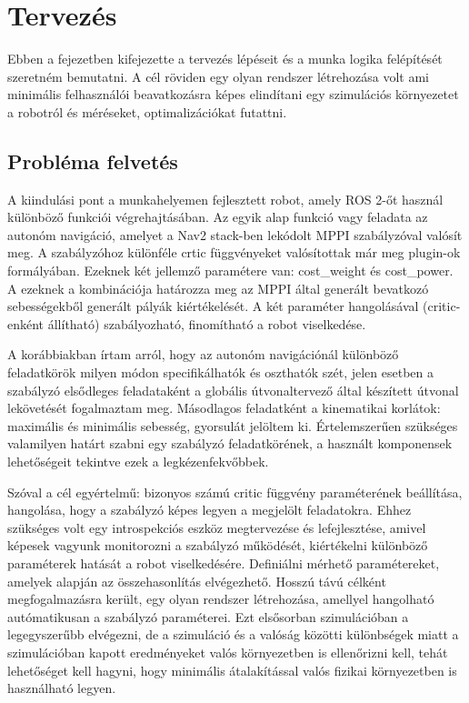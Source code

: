 \chapter{Tervezés}
Ebben a fejezetben kifejezette a tervezés lépéseit és a munka logika felépítését szeretném bemutatni. A cél röviden egy olyan rendszer létrehozása volt ami minimális felhasználói beavatkozásra képes elindítani egy szimulációs környezetet a robotról és méréseket, optimalizációkat futattni.

\section{Probléma felvetés}
A kiindulási pont a munkahelyemen fejlesztett robot, amely ROS 2-őt használ különböző funkciói végrehajtásában. Az egyik alap funkció vagy feladata az autonóm navigáció, amelyet a Nav2 stack-ben lekódolt MPPI szabályzóval valósít meg. A szabályzóhoz különféle crtic függvényeket valósítottak már meg plugin-ok formályában. Ezeknek két jellemző paramétere van: cost\_weight és cost\_power. A ezeknek a kombinációja határozza meg az MPPI által generált bevatkozó sebességekből generált pályák kiértékelését. A két paraméter hangolásával (critic-enként állítható) szabályozható, finomítható a robot viselkedése.

A korábbiakban írtam arról, hogy az autonóm navigációnál különböző feladatkörök milyen módon specifikálhatók és oszthatók szét, jelen esetben a szabályzó elsődleges feladataként a globális útvonaltervező által készített útvonal lekövetését fogalmaztam meg. Másodlagos feladatként a kinematikai korlátok: maximális és minimális sebesség, gyorsulát jelöltem ki. Értelemszerűen szükséges valamilyen határt szabni egy szabályzó feladatkörének, a használt komponensek lehetőségeit tekintve ezek a legkézenfekvőbbek.

Szóval a cél egyértelmű: bizonyos számú critic függvény paraméterének beállítása, hangolása, hogy a szabályzó képes legyen a megjelölt feladatokra. Ehhez szükséges volt egy introspekciós eszköz megtervezése és lefejlesztése, amivel képesek vagyunk monitorozni a szabályzó működését, kiértékelni különböző paraméterek hatását a robot viselkedésére. Definiálni mérhető paramétereket, amelyek alapján az összehasonlítás elvégezhető. Hosszú távú célként megfogalmazásra került, egy olyan rendszer létrehozása, amellyel hangolható autómatikusan a szabályzó paraméterei. Ezt elsősorban szimulációban a legegyszerűbb elvégezni, de a szimuláció és a valóság közötti különbségek miatt a szimulációban kapott eredményeket valós környezetben is ellenőrizni kell, tehát lehetőséget kell hagyni, hogy minimális átalakítással valós fizikai környezetben is használható legyen.

